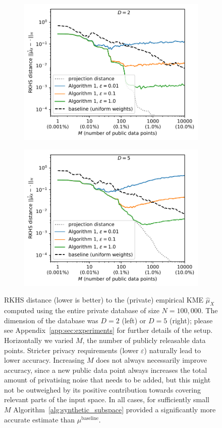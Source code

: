 \documentclass{article}
\theoremstyle{plain}
\theoremstyle{remark}
\theoremstyle{definition}
\begin{document}
\begin{figure}[!t]
	\centering
	\begin{subfigure}{.5\linewidth}
		\includegraphics[width=0.95\linewidth]{../figures/leaksD2.pdf}
	\end{subfigure}%
	\begin{subfigure}{.5\linewidth}
		\includegraphics[width=0.95\linewidth]{../figures/leaksD5.pdf}
	\end{subfigure}
	\vspace{-0.75em}
	\caption{\small{RKHS distance (lower is better) to the (private) empirical KME $\hat{\mu}_X$ computed using the entire private database of size $N = 100,000$. The dimension of the database was $D = 2$ (left) or $D = 5$ (right); please see Appendix~\ref{app:sec:experiments} for further details of the setup. Horizontally we varied $M$, the number of publicly releasable data points. Stricter privacy requirements (lower $\varepsilon$) naturally lead to lower accuracy. Increasing $M$ does not always necessarily improve accuracy, since a new public data point always increases the total amount of privatising noise that needs to be added, but this might not be outweighed by its positive contribution towards covering relevant parts of the input space. In all cases, for sufficiently small $M$ Algorithm~\ref{alg:synthetic_subspace} provided a significantly more accurate estimate than $\mu^{\text{baseline}}$.}}
	\label{fig:leaks}
\end{figure}
\end{document}
